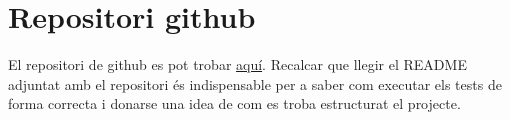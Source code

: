 \documentclass[12pt, letterpaper]{article}
\begin{document}
\newpage

\appendix

\section{Repositori github}
\label{github}

El repositori de github es pot trobar \href{https://github.com/Algorismia/Aquaeductus-Optimus}{aquí}. Recalcar que llegir el README adjuntat amb el repositori és indispensable per a saber com executar els tests de forma correcta i donarse una idea de com es troba estructurat el projecte. 
\end{document}
